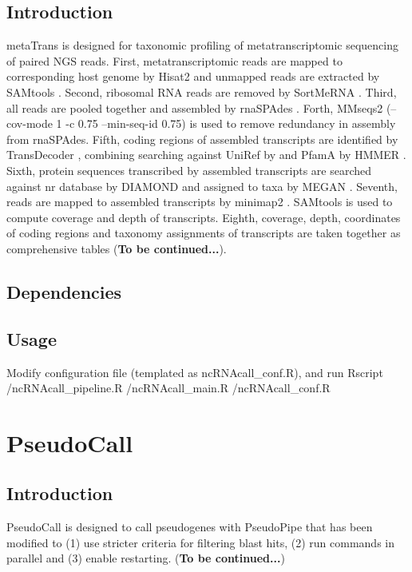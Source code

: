 \documentclass[11pt]{article}
\begin{document}
\begin{sloppypar}
\subsection{Introduction}
metaTrans is designed for taxonomic profiling of metatranscriptomic sequencing of paired NGS reads. 
First, metatranscriptomic reads are mapped to corresponding host genome by Hisat2 \parencite{kim2019graph} and unmapped reads are extracted by SAMtools \parencite{li2009sequence}. 
Second, ribosomal RNA reads are removed by SortMeRNA \parencite{kopylova2012sortmerna}. 
Third, all reads are pooled together and assembled by rnaSPAdes \parencite{bushmanova2019rnaspades}. 
Forth, MMseqs2 \parencite{steinegger2017mmseqs2} (--cov-mode 1 -c 0.75 --min-seq-id 0.75) is used to remove redundancy in assembly from rnaSPAdes. 
Fifth, coding regions of assembled transcripts are identified by TransDecoder \parencite{haas2016transdecoder}, combining searching against UniRef \parencite{suzek2007uniref} by \parencite{buchfink2015fast} and PfamA \parencite{mistry2021pfam} by HMMER \parencite{eddy1992hmmer}. 
Sixth, protein sequences transcribed by assembled transcripts are searched against nr database by DIAMOND \parencite{buchfink2015fast} and assigned to taxa by MEGAN \parencite{huson2007megan}. 
Seventh, reads are mapped to assembled transcripts by minimap2 \parencite{li2018minimap2}. 
SAMtools is used to compute coverage and depth of transcripts. 
Eighth, coverage, depth, coordinates of coding regions and taxonomy assignments of transcripts are taken together as comprehensive tables (\textbf{To be continued...}).
\subsection{Dependencies}
\subsection{Usage}
Modify configuration file (templated as ncRNAcall\_conf.R), and run \newline
Rscript /ncRNAcall\_pipeline.R /ncRNAcall\_main.R /ncRNAcall\_conf.R

\section{PseudoCall}
\subsection{Introduction}
PseudoCall is designed to call pseudogenes with PseudoPipe that has been modified to (1) use stricter criteria for filtering blast hits, (2) run commands in parallel and (3) enable restarting. (\textbf{To be continued...})

\end{sloppypar}
\end{document}
